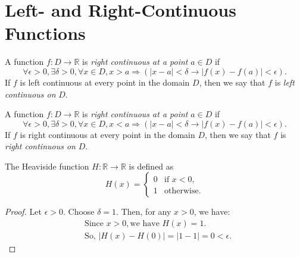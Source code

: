 \section{Left- and Right-Continuous Functions}

\begin{definition}\label{def:leftcontinuous}
    A function $f : D \to \mathbb{R}$ is \textit{right continuous at a point} $a \in D$ if 
    \[
        \forall \epsilon > 0, \exists \delta > 0, \forall x \in D, x > a \Rightarrow (|x - a| < \delta \rightarrow |f(x) - f(a)| < \epsilon).
        \]
    If $f$ is left continuous at every point in the domain $D$, then we say that $f$ is \textit{left continuous on} $D$.
\end{definition}

\begin{definition}\label{def:rightcontinuous}
    A function $f : D \to \mathbb{R}$ is \textit{right continuous at a point} $a \in D$ if 
    \[
        \forall \epsilon > 0, \exists \delta > 0, \forall x \in D, x < a \Rightarrow (|x - a| < \delta \rightarrow |f(x) - f(a)| < \epsilon).
        \]
    If $f$ is right continuous at every point in the domain $D$, then we say that $f$ is \textit{right continuous on} $D$.
\end{definition}

\begin{definition}\label{def:heaviside}
    The Heaviside function $H : \mathbb{R} \to \mathbb{R}$ is defined as
    \[
    H(x) = \begin{cases} 
    0 & \text{if } x < 0, \\
    1 & \text{otherwise}.
    \end{cases}
    \]
\end{definition}


\begin{proof}
    Let $\epsilon > 0$. Choose $\delta = 1$. Then, for any $x > 0$, we have:
    \[
    \begin{aligned}
    &\text{Since } x > 0, \text{we have } H(x) = 1. \\
    &\text{So, } |H(x) - H(0)| = |1 - 1| = 0 < \epsilon.
    \end{aligned}
    \]
\end{proof}

